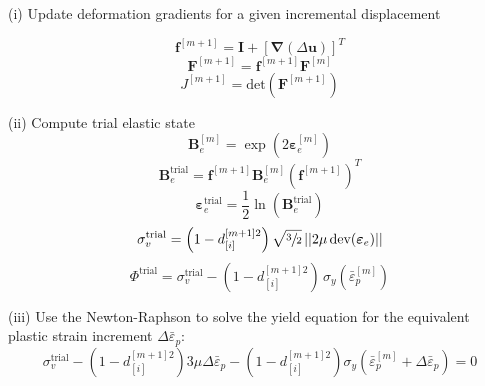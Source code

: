 \documentclass[sn-mathphys,Numbered]{sn-jnl}%
\newcommand{\bb}{\boldsymbol}
\begin{document}
\begin{algorithm}[htbp] \label{alg:phaseField} \footnotesize
\SetAlgoLined
(i) Update deformation gradients for a given incremental displacement

\begin{equation}
  \bb{f}^{[m+1]} = \bb{I} + \left[ \bb{\nabla}(\Delta\textbf{u}) \right]^T \nonumber
\end{equation}
\begin{equation}
  \bb{F}^{[m+1]} = \bb{f}^{[m+1]} \bb{F}^{[m]}  \nonumber
\end{equation}
\begin{equation}
  J^{[m+1]} = \text{det} \left( \bb{F}^{[m+1]} \right) \nonumber
\end{equation}

(ii) Compute trial elastic state
\begin{equation}
	\bb{B}_{e}^{[m]} = \exp\left({2\boldsymbol{\varepsilon}_{e}^{[m]}}\right) \nonumber
\end{equation}
\begin{equation}
	\bb{B}^{\text{trial}}_e = \bb{f}^{[m+1]}\bb{B}^{[m]}_e \left(\bb{f}^{[m+1]}\right)^{T}\nonumber
\end{equation}
\begin{equation}
	\boldsymbol{\varepsilon}^{\text{trial}}_e = \frac{1}{2} \ln \left(\textbf{B}^{\text{trial}}_e \right) \nonumber
\end{equation}
\begin{equation}
	\sigma_v^{\text{trial}} =
	\left(1 - d_{[i]}^{[m+1]2} \right) \sqrt{\sfrac{3}{2}} \, || 2\mu \, \text{dev}(\bb{\varepsilon}_e)|| \nonumber
\end{equation}
\begin{equation}
	\Phi^{\text{trial}} =
	\sigma_v^{\text{trial}}
	- \left(1 - d_{[i]}^{[m+1]2} \right) \, \sigma_{y}\left(\bar{\varepsilon}_p^{[m]} \right) \nonumber 
\end{equation}

(iii) Use the Newton-Raphson to solve the yield equation for the equivalent plastic strain increment $\Delta\bar{\varepsilon}_p$:
\begin{equation}
	\sigma_v^{\text{trial}}
	- \left(1 - d_{[i]}^{[m+1]2} \right) 3 \mu\Delta\bar{\varepsilon}_p
	- \left(1 - d_{[i]}^{[m+1]2} \right) \sigma_{y}(\bar{\varepsilon}_{p}^{[m]} + \Delta\bar{\varepsilon}_p)
	= 0 \nonumber
\end{equation}



\end{algorithm}
\end{document}
